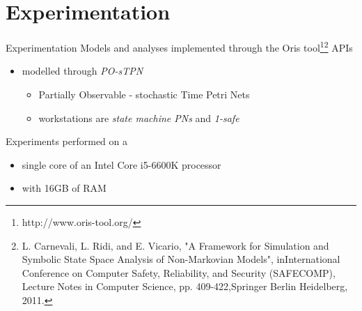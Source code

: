 
\section{Experimentation}

  \begin{frame}{Experimentation}
    Models and analyses implemented through the Oris tool\footnote{\scriptsize http://www.oris-tool.org/}\footnote{\scriptsize L. Carnevali, L. Ridi, and E. Vicario, "A Framework for Simulation and Symbolic State Space Analysis of Non-Markovian Models", inInternational Conference on Computer Safety, Reliability, and Security (SAFECOMP), Lecture Notes in Computer Science, pp. 409-422,Springer Berlin Heidelberg, 2011.} APIs
    \begin{itemize}
      \item modelled through \textit{PO-sTPN}
      \begin{itemize}
        \item Partially Observable - stochastic Time Petri Nets
        \item workstations are \textit{state machine PNs} and \textit{1-safe}
      \end{itemize}
    \end{itemize}
    
    \begin{center}\scalebox{0.8}{}\end{center}
    
    Experiments performed on a
    \begin{itemize}
      \item single core of an Intel Core i5-6600K processor
      \item with 16GB of RAM
    \end{itemize}
  \end{frame}

